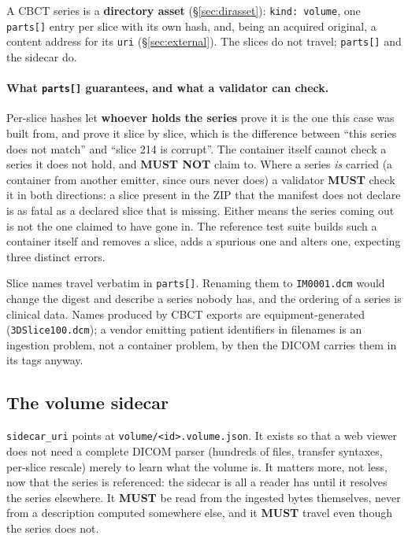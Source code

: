 \documentclass[11pt,a4paper]{article}
\newcommand{\MUST}{\textcolor{uosred}{\textbf{MUST}}}
\newcommand{\MUSTNOT}{\textcolor{uosred}{\textbf{MUST NOT}}}
\newcommand{\code}[1]{\texttt{\small #1}}
\begin{document}
A CBCT series is a \textbf{directory asset} (\S\ref{sec:dirasset}): \code{kind: volume},
one \code{parts[]} entry per slice with its own hash, and, being an acquired original, a content address for its \code{uri} (\S\ref{sec:external}). The slices do not travel;
\code{parts[]} and the sidecar do.

\paragraph{What \code{parts[]} guarantees, and what a validator can check.}
Per-slice hashes let \textbf{whoever holds the series} prove it is the one this case was
built from, and prove it slice by slice, which is the difference between ``this series
does not match'' and ``slice 214 is corrupt''. The container itself cannot check a series
it does not hold, and \MUSTNOT{} claim to. Where a series \emph{is} carried (a container from another emitter, since ours never does) a validator \MUST{} check it in both directions: a slice present in the ZIP that
the manifest does not declare is as fatal as a declared slice that is missing. Either means
the series coming out is not the one claimed to have gone in. The reference test suite
builds such a container itself and removes a slice, adds a spurious one and alters one,
expecting three distinct errors.

\newpage
Slice names travel verbatim in \code{parts[]}. Renaming them to \code{IM0001.dcm} would
change the digest and describe a series nobody has, and the ordering of a series is clinical
data. Names produced by CBCT exports are equipment-generated (\code{3DSlice100.dcm}); a
vendor emitting patient identifiers in filenames is an ingestion problem, not a container
problem, by then the DICOM carries them in its tags anyway.

\subsection{The volume sidecar}

\code{sidecar\_uri} points at \code{volume/<id>.volume.json}. It exists so that a web
viewer does not need a complete DICOM parser (hundreds of files, transfer syntaxes,
per-slice rescale) merely to learn what the volume is. It matters more, not less, now
that the series is referenced: the sidecar is all a reader has until it resolves the series
elsewhere. It \MUST{} be read from the ingested bytes themselves, never from a description
computed somewhere else, and it \MUST{} travel even though the series does not.
\end{document}
